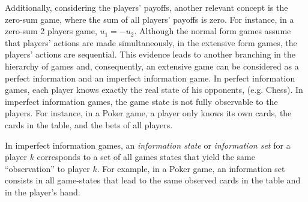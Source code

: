 Additionally, considering the players' payoffs, another relevant concept is the zero-sum game, where the sum of all players' payoffs is zero.
For instance, in a zero-sum 2 players game, $u_1 = -u_2$.
Although the normal form games assume that players' actions are made simultaneously, in the extensive form games, the players' actions are sequential.
This evidence leads to another branching in the hierarchy of games and, consequently, an extensive game can be considered as a perfect information and an imperfect information game.
In perfect information games, each player knows exactly the real state of his opponents, (e.g. Chess).
In imperfect information games, the game state is not fully observable to the players. For instance, in a Poker game, a player only knows its own cards, the cards in the table, and the bets of all players. 

In imperfect information games, an \emph{information state} or \emph{information set} for a player $k$ corresponds to a set of all games states that yield the same “observation” to player $k$. For example, in a Poker game, an information set consists in all game-states that lead to the same observed cards in the table and in the player’s hand.




